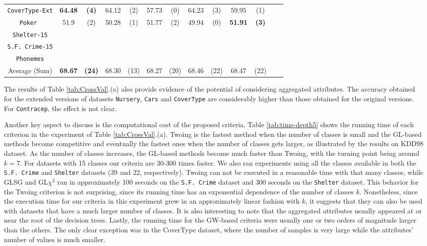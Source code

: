 \begin{table*}[t]
\begin{tabular}{c|cc|cc|cc|cc|cc|cc}
{\tt CoverType-Ext} & {\bf  64.48} & {\bf  (4)} & 64.12 & (2) & 57.73 & (0) & 64.23 & (3) & 59.95 & (1) & & \\ 
{\tt Poker } & 51.9 & (2) &50.28 & (1) & 51.77 & (2) & 49.94 & (0) & {\bf  51.91} & {\bf  (3)} & & \\ 
{\tt Shelter-15}   &  &  & &  & & & &  &  & & &        \\   
{\tt S.F. Crime-15} &  &  & &  & & & &  &  & & &       \\ 
{\tt Phonemes}      &  &  & &  & & & &  &  & & &       \\
\hline
Average (Sum) &             {\bf  68.67}  &  {\bf  (24)}  & 68.30  &  (13)  & 68.27 &  (20)   & 68.46 &  (22)   & 68.47 &  (22) & & 

\end{tabular}
\label{exp:thirdset}
\normalsize
\end{table*}


The results of  Table \ref{tab:CrossVal}.(a) also
provide evidence of  the potential
of considering aggregated attributes. 
The accuracy obtained for the extended versions of datasets
{\tt Nursery}, {\tt Cars} and {\tt CoverType} are considerably higher than those obtained for 
the original versions. For {\tt Contracep}, the effect is not clear.

Another key aspect to discuss is the computational cost of the
proposed criteria. Table \ref{tab:time-depth5} shows the running time of each criterion in the experiment of Table \ref{tab:CrossVal}.(a). Twoing is the fastest method when the number of classes is small and the GL-based methods become competitive and eventually the
fastest ones when the number of classes gets larger, as illustrated by the results on KDD98 dataset. As the number of classes increases, the GL-based methods become much faster than Twoing, with the turning point being around $k=7$. For datasets with 15 classes our criteria are 30-300 times faster. We also ran experiments using all the classes available in both the {\tt S.F. Crime} and {\tt Shelter} datasets (39 and 22, respectively). Twoing can not be executed in a reasonable time with that many classes, while GLSG and GL$\chi^2$ ran in approximately 100 seconds on the {\tt S.F. Crime} dataset and  300 seconds on the {\tt Shelter} dataset.  This behavior for the Twoing criterion is not surprising, since its running time has an exponential dependence of the number of classes $k$. Nonetheless, since the execution time for our criteria in this experiment grew in an approximately linear fashion with $k$, it suggests that they can also be used with datasets that have a much larger number of classes. It is also interesting to note that the aggregated attributes usually appeared at or near the root of the decision trees. Lastly, the running time for the GW-based criteria were usually one or two orders of magnitude larger than the others. The only clear exception was in the CoverType dataset, where the number of samples is very large while the attributes’ number of values is much smaller.

